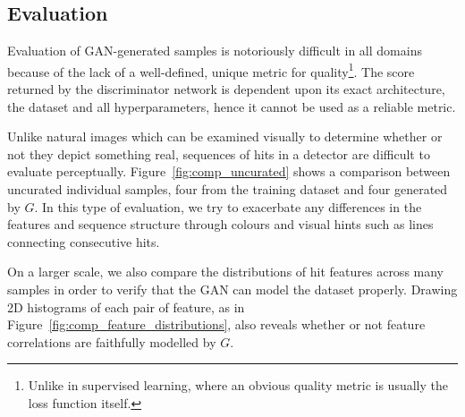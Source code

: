 



\subsection{Evaluation}
\label{sec:gan_eval}
Evaluation of GAN-generated samples is notoriously difficult in all domains
because of the lack of a well-defined, unique metric for quality\footnote{Unlike
in supervised learning, where an obvious quality metric is usually the loss
function itself.}. The score
returned by the discriminator network is dependent upon its exact architecture,
the dataset and all hyperparameters, hence it cannot be used as a reliable metric. 

Unlike natural images which can be examined visually to determine whether or not
they depict something real, sequences of hits in a detector are difficult to
evaluate perceptually. 
Figure~\ref{fig:comp_uncurated} shows a comparison between uncurated individual
samples, four from the training dataset and four generated by $G$. In this type
of evaluation, we try to exacerbate any differences in the features and
sequence structure through colours and visual hints such as lines connecting
consecutive hits.

On a larger scale, we also compare the distributions of hit features across many
samples in order to verify that the GAN can model the dataset properly. Drawing
2D histograms of each pair of feature, as in
Figure~\ref{fig:comp_feature_distributions}, also reveals whether or not feature
correlations are faithfully modelled by $G$.

